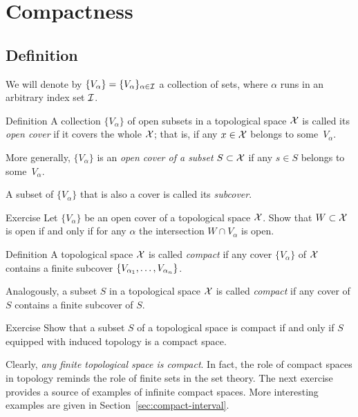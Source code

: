 \chapter{Compactness}

\section{Definition}

We will denote by $\{V_\alpha\}=\{V_\alpha\}_{\alpha\in \mathcal{I}}$ a collection of sets, where $\alpha$ runs in an arbitrary index set $\mathcal{I}$. 

\begin{thm}{Definition}
A collection $\{V_\alpha\}$ of open subsets in a topological space $\mathcal{X}$ is called its \emph{open cover} if it covers the whole $\mathcal{X}$;
that is, if any $x\in \mathcal{X}$ belongs to some~$V_\alpha$.

More generally, $\{V_\alpha\}$ is an {}\emph{open cover of a subset} $S\subset \mathcal{X}$ if any $s\in S$ belongs to some~$V_\alpha$.

A subset of $\{V_\alpha\}$ that is also a cover is called its \emph{subcover}.
\end{thm}

\begin{thm}{Exercise}\label{ex:open-open-cover}
Let $\{V_\alpha\}$ be an open cover of a topological space $\mathcal{X}$.
Show that $W\subset \mathcal{X}$ is open if and only if for any $\alpha$ the intersection $W\cap V_\alpha$ is open.  
\end{thm}

\begin{thm}{Definition}
A topological space $\mathcal{X}$ is called \emph{compact} if any cover $\{V_\alpha\}$ of $\mathcal{X}$
contains a finite subcover $\{V_{\alpha_1},\z\dots,V_{\alpha_n}\}$.

Analogously, a subset $S$ in a topological space $\mathcal{X}$ is called {}\emph{compact} if any cover of $S$
contains a finite subcover of $S$.
\end{thm}

\begin{thm}{Exercise}\label{ex:compact-set-subspace}
Show that a subset $S$ of a topological space is compact if and only if $S$ equipped with induced topology is a compact space.
\end{thm}

Clearly, \textit{any finite topological space is compact}.
In fact, the role of compact spaces in topology reminds the role of finite sets in the set theory.
The next exercise provides a source of examples of infinite compact spaces.
More interesting examples are given in Section~\ref{sec:compact-interval}.

